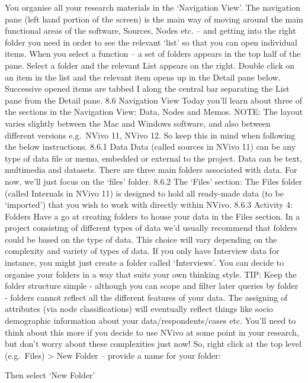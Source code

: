 \documentclass[
]{book}
\begin{document}
You organise all your research materials in the `Navigation View'. The navigation pane (left hand portion of the screen) is the main way of moving around the main functional areas of the software, Sources, Nodes etc. -- and getting into the right folder you need in order to see the relevant `list' so that you can open individual items. When you select a function -- a set of folders appears in the top half of the pane. Select a folder and the relevant List appears on the right. Double click on an item in the list and the relevant item opens up in the Detail pane below. Successive opened items are tabbed I along the central bar separating the List pane from the Detail pane.
8.6 Navigation View
Today you'll learn about three of the sections in the Navigation View: Data, Nodes and Memos.
NOTE: The layout varies slightly between the Mac and Windows software, and also between different versions e.g.~NVivo 11, NVivo 12. So keep this in mind when following the below instructions.
8.6.1 Data
Data (called sources in NVivo 11) can be any type of data file or memo, embedded or external to the project.
Data can be text, multimedia and datasets. There are three main folders associated with data. For now, we'll just focus on the `files' folder.
8.6.2 The `Files' section:
The Files folder (called Internals in NVivo 11) is designed to hold all ready-made data (to be `imported') that you wish to work with directly within NVivo.
8.6.3 Activity 4: Folders
Have a go at creating folders to house your data in the Files section. In a project consisting of different types of data we'd usually recommend that folders could be based on the type of data. This choice will vary depending on the complexity and variety of types of data. If you only have Interview data for instance, you might just create a folder called `Interviews'. You can decide to organise your folders in a way that suits your own thinking style.
TIP: Keep the folder structure simple - although you can scope and filter later queries by folder - folders cannot reflect all the different features of your data. The assigning of attributes (via node classifications) will eventually reflect things like socio demographic information about your data/respondents/cases etc. You'll need to think about this more if you decide to use NVivo at some point in your research, but don't worry about these complexities just now!
So, right click at the top level (e.g.~Files) \textgreater{} New Folder -- provide a name for your folder:

Then select `New Folder'
\end{document}
